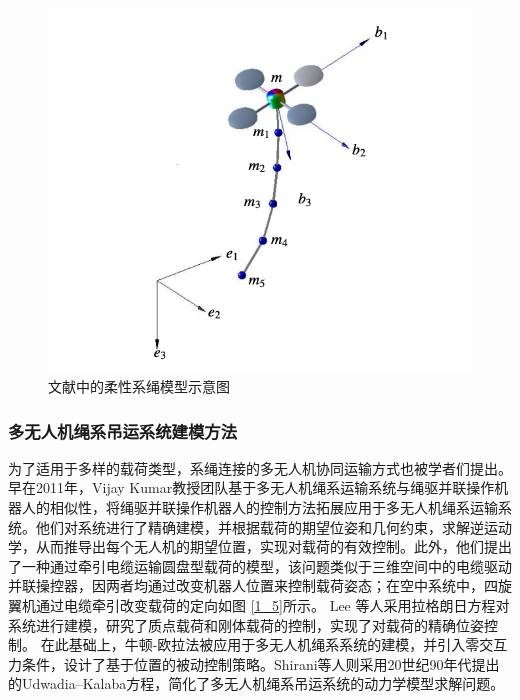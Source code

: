 \documentclass[lang=chs, degree=master, blindreview=false, winfonts=true]{yanputhesis}
\begin{document}
\begin{figure}[hbt!]
	\centering
	\includegraphics[width=28pc]{picture/1_4.png} 
	\caption{文献中的柔性系绳模型示意图} \label{1_4}
\end{figure}


\subsubsection{多无人机绳系吊运系统建模方法}
为了适用于多样的载荷类型，系绳连接的多无人机协同运输方式也被学者们提出。早在2011年，Vijay Kumar教授团队基于多无人机绳系运输系统与绳驱并联操作机器人\cite{Gouttefarde2006,Gouttefarde2011}的相似性，将绳驱并联操作机器人的控制方法拓展应用于多无人机绳系运输系统。他们对系统进行了精确建模，并根据载荷的期望位姿和几何约束，求解逆运动学，从而推导出每个无人机的期望位置，实现对载荷的有效控制\cite{Fink2011,michael2011cooperative,Jiang2013}。此外，他们提出了一种通过牵引电缆运输圆盘型载荷的模型\cite{goodarzi2015geometric}，该问题类似于三维空间中的电缆驱动并联操控器，因两者均通过改变机器人位置来控制载荷姿态；在空中系统中，四旋翼机通过电缆牵引改变载荷的定向如图 \ref{1_5}所示。
Lee 等人采用拉格朗日方程对系统进行建模，研究了质点载荷\cite{lee2013geometric}和刚体载荷\cite{lee2017geometric}的控制，实现了对载荷的精确位姿控制。
在此基础上，牛顿-欧拉法被应用于多无人机绳系系统的建模，并引入零交互力条件，设计了基于位置的被动控制策略\cite{cardona2019cooperative}。Shirani等人则采用20世纪90年代提出的Udwadia–Kalaba方程\cite{udwadia1992new,udwadia1996equations}，简化了多无人机绳系吊运系统的动力学模型求解问题\cite{shirani2019cooperative}。
\end{document}

